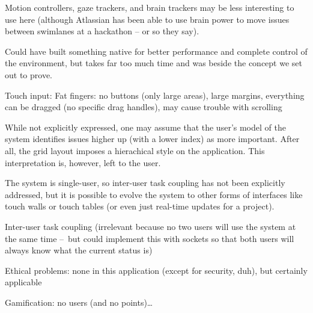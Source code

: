 Motion controllers, gaze trackers, and brain trackers may be less interesting to use here (although Atlassian has been able to use brain power to move issues between swimlanes at a hackathon – or so they say).

Could have built something native for better performance and complete control of the environment, but takes far too much time and was beside the concept we set out to prove.

Touch input: Fat fingers: no buttons (only large areas), large margins, everything can be dragged (no specific drag handles), may cause trouble with scrolling

While not explicitly expressed, one may assume that the user's model of the system identifies issues higher up (with a lower index) as more important. After all, the grid layout imposes a hierachical style on the application. This interpretation is, however, left to the user.





The system is single-user, so inter-user task coupling has not been explicitly addressed, but it is possible to evolve the system to other forms of interfaces like touch walls or touch tables (or even just real-time updates for a project).

Inter-user task coupling (irrelevant because no two users will use the system at the same time – but could implement this with sockets so that both users will always know what the current status is)





Ethical problems: none in this application (except for security, duh), but certainly applicable %

Gamification: no users (and no points)\dots %

